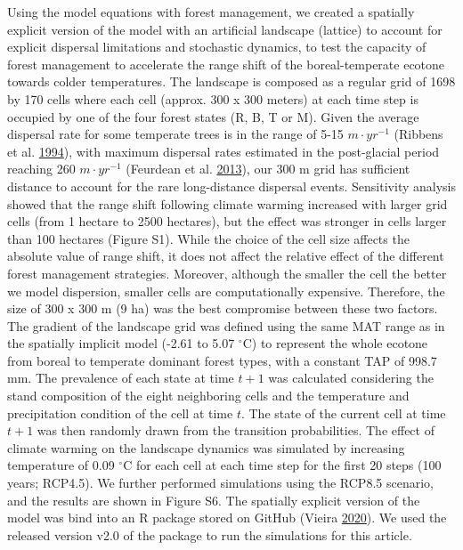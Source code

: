 \documentclass[12pt]{article}
\begin{document}
Using the model equations with forest management, we created a spatially
explicit version of the model with an artificial landscape (lattice) to
account for explicit dispersal limitations and stochastic dynamics, to
test the capacity of forest management to accelerate the range shift of
the boreal-temperate ecotone towards colder temperatures. The landscape
is composed as a regular grid of 1698 by 170 cells where each cell
(approx. 300 x 300 meters) at each time step is occupied by one of the
four forest states (R, B, T or M). Given the average dispersal rate for
some temperate trees is in the range of 5-15 \(m \cdot yr^{-1}\)
(Ribbens et al. \protect\hyperlink{ref-Ribbens1994}{1994}), with maximum
dispersal rates estimated in the post-glacial period reaching 260
\(m \cdot yr^{-1}\) (Feurdean et al.
\protect\hyperlink{ref-Feurdean2013}{2013}), our 300 m grid has
sufficient distance to account for the rare long-distance dispersal
events. Sensitivity analysis showed that the range shift following
climate warming increased with larger grid cells (from 1 hectare to 2500
hectares), but the effect was stronger in cells larger than 100 hectares
(Figure S1). While the choice of the cell size affects the absolute
value of range shift, it does not affect the relative effect of the
different forest management strategies. Moreover, although the smaller
the cell the better we model dispersion, smaller cells are
computationally expensive. Therefore, the size of 300 x 300 m (9 ha) was
the best compromise between these two factors. The gradient of the
landscape grid was defined using the same MAT range as in the spatially
implicit model (-2.61 to 5.07 \(^{\circ}\)C) to represent the whole
ecotone from boreal to temperate dominant forest types, with a constant
TAP of 998.7 mm. The prevalence of each state at time \(t + 1\) was
calculated considering the stand composition of the eight neighboring
cells and the temperature and precipitation condition of the cell at
time \(t\). The state of the current cell at time \(t + 1\) was then
randomly drawn from the transition probabilities. The effect of climate
warming on the landscape dynamics was simulated by increasing
temperature of 0.09 \(^{\circ}\)C for each cell at each time step for
the first 20 steps (100 years; RCP4.5). We further performed simulations
using the RCP8.5 scenario, and the results are shown in Figure S6. The
spatially explicit version of the model was bind into an R package
stored on GitHub (Vieira \protect\hyperlink{ref-STManaged2020}{2020}).
We used the released version v2.0 of the package to run the simulations
for this article.
\end{document}
